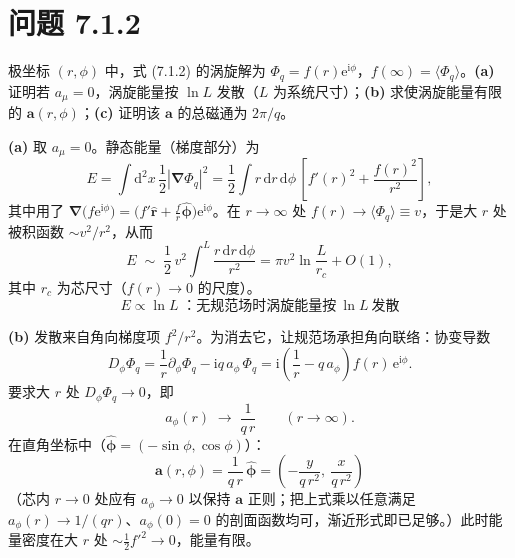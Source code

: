 \section*{问题 7.1.2}
\begin{problem}
极坐标 $(r,\phi)$ 中，式 (7.1.2) 的涡旋解为 $\Phi_q=f(r)\mathrm{e}^{\mathrm{i}\phi}$，$f(\infty)=\langle\Phi_q\rangle$。\textbf{(a)} 证明若 $a_\mu=0$，涡旋能量按 $\ln L$ 发散（$L$ 为系统尺寸）；\textbf{(b)} 求使涡旋能量有限的 $\pmb{a}(r,\phi)$；\textbf{(c)} 证明该 $\pmb{a}$ 的总磁通为 $2\pi/q$。
\end{problem}
\solution
\textbf{(a)} 取 $a_\mu=0$。静态能量（梯度部分）为
\begin{equation*}
E=\int\mathrm{d}^2x\,\frac12\left|\pmb{\nabla}\Phi_q\right|^2
=\frac12\int r\,\mathrm{d}r\,\mathrm{d}\phi\,
\left[f'(r)^2+\frac{f(r)^2}{r^2}\right],
\end{equation*}
其中用了 $\pmb{\nabla}\big(f\mathrm{e}^{\mathrm{i}\phi}\big)
=\big(f'\hat{\pmb r}+\tfrac{f}{r}\hat{\pmb\phi}\big)\mathrm{e}^{\mathrm{i}\phi}$。在 $r\to\infty$ 处 $f(r)\to\langle\Phi_q\rangle\equiv v$，于是大 $r$ 处被积函数 $\sim v^2/r^2$，从而
\begin{equation*}
E\;\sim\;\frac12\,v^2\int^L\frac{r\,\mathrm{d}r\,\mathrm{d}\phi}{r^2}
=\pi v^2\ln\frac{L}{r_c}+O(1),
\end{equation*}
其中 $r_c$ 为芯尺寸（$f(r)\to0$ 的尺度）。
\begin{equation*}
\boxed{\;E\propto\ln L\;\text{：无规范场时涡旋能量按}\ \ln L\ \text{发散}\;}
\end{equation*}

\textbf{(b)} 发散来自角向梯度项 $f^2/r^2$。为消去它，让规范场承担角向联络：协变导数
\begin{equation*}
D_\phi\Phi_q=\frac{1}{r}\partial_\phi\Phi_q-\mathrm{i}q\,a_\phi\,\Phi_q
=\mathrm{i}\left(\frac{1}{r}-q\,a_\phi\right)f(r)\,\mathrm{e}^{\mathrm{i}\phi}.
\end{equation*}
要求大 $r$ 处 $D_\phi\Phi_q\to0$，即
\begin{equation*}
a_\phi(r)\;\longrightarrow\;\frac{1}{q\,r}\qquad(r\to\infty).
\end{equation*}
在直角坐标中（$\hat{\pmb\phi}=(-\sin\phi,\cos\phi)$）：
\begin{equation*}
\boxed{\;\pmb{a}(r,\phi)=\frac{1}{q\,r}\,\hat{\pmb\phi}
=\left(-\frac{y}{q\,r^2},\ \frac{x}{q\,r^2}\right)\;}
\end{equation*}
（芯内 $r\to0$ 处应有 $a_\phi\to0$ 以保持 $\pmb{a}$ 正则；把上式乘以任意满足 $a_\phi(r)\to1/(qr)$、$a_\phi(0)=0$ 的剖面函数均可，渐近形式即已足够。）此时能量密度在大 $r$ 处 $\sim\tfrac12f'^2\to0$，能量有限。

